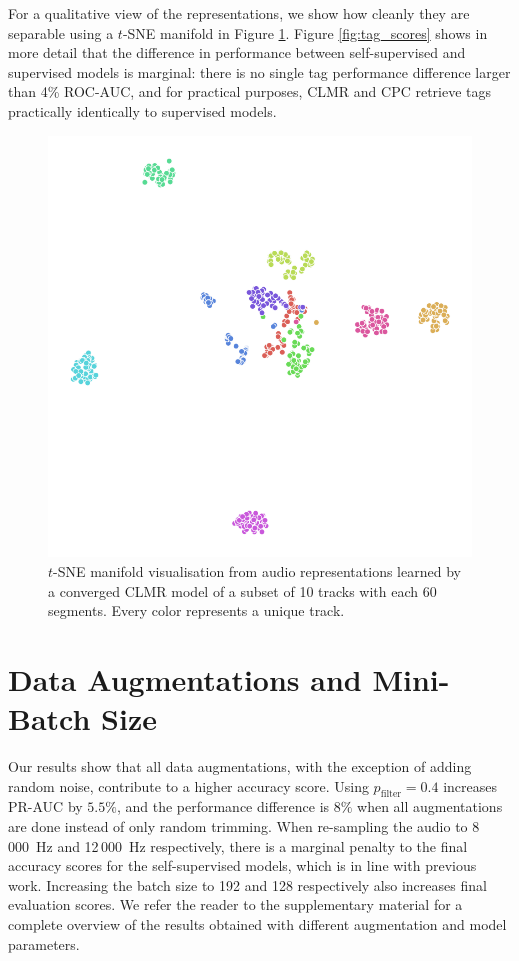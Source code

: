 For a qualitative view of the representations, we show how cleanly they are  separable using a $t$-SNE manifold in Figure \ref{fig:tsne_manifold}.
Figure \ref{fig:tag_scores} shows in more detail that the difference in performance between self-supervised and supervised models is marginal: there is no single tag performance difference larger than 4\% ROC-AUC, and for practical purposes, CLMR and CPC retrieve tags practically identically to supervised models.

\begin{figure}[t]
    \centering
    \includegraphics[width=0.75\columnwidth]{figs/tsne-clmr.png}
    \caption{$t$-SNE manifold visualisation from audio representations learned by a converged CLMR model of a subset of 10 tracks with each 60 segments.
Every color represents a unique track.}
    \label{fig:tsne_manifold}
\end{figure}



\section{Data Augmentations and Mini-Batch Size}
Our results show that all data augmentations, with the exception of adding random noise, contribute to a higher accuracy score.
Using $p_{\mathrm{filter}}=0.4$ increases PR-AUC by $5.5\%$, and the performance difference is $8\%$ when all augmentations are done instead of only random trimming.
When re-sampling the audio to 8\,000~Hz and 12\,000~Hz respectively, there is a marginal penalty to the final accuracy scores for the self-supervised models, which is in line with previous work\cite{lee2018samplecnn}.
Increasing the batch size to 192 and 128 respectively also increases final evaluation scores.
We refer the reader to the supplementary material for a complete overview of the results obtained with different augmentation and model parameters.

